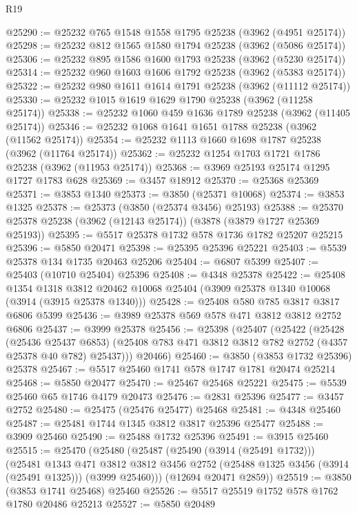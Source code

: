 \begin{lexlean}{R19}
\begin{coremodule}
@25290 := @25232 @765 @1548 @1558 @1795 @25238 (@3962 (@4951 @25174))
@25298 := @25232 @812 @1565 @1580 @1794 @25238 (@3962 (@5086 @25174))
@25306 := @25232 @895 @1586 @1600 @1793 @25238 (@3962 (@5230 @25174))
@25314 := @25232 @960 @1603 @1606 @1792 @25238 (@3962 (@5383 @25174))
@25322 := @25232 @980 @1611 @1614 @1791 @25238 (@3962 (@11112 @25174))
@25330 := @25232 @1015 @1619 @1629 @1790 @25238 (@3962 (@11258 @25174))
@25338 := @25232 @1060 @459 @1636 @1789 @25238 (@3962 (@11405 @25174))
@25346 := @25232 @1068 @1641 @1651 @1788 @25238 (@3962 (@11562 @25174))
@25354 := @25232 @1113 @1660 @1698 @1787 @25238 (@3962 (@11764 @25174))
@25362 := @25232 @1254 @1703 @1721 @1786 @25238 (@3962 (@11953 @25174))
@25368 := @3969 @25193 @25174 @1295 @1727 @1783 @628
@25369 := @3457 @18912
@25370 := @25368 @25369
@25371 := @3853 @1340
@25373 := @3850 (@25371 @10068)
@25374 := @3853 @1325
@25378 := @25373 (@3850 (@25374 @3456) @25193)
@25388 := @25370 @25378 @25238 (@3962 (@12143 @25174)) (@3878 (@3879 @1727 @25369 @25193))
@25395 := @5517 @25378 @1732 @578 @1736 @1782 @25207 @25215
@25396 := @5850 @20471
@25398 := @25395 @25396 @25221
@25403 := @5539 @25378 @134 @1735 @20463 @25206
@25404 := @6807 @5399
@25407 := @25403 (@10710 @25404) @25396
@25408 := @4348 @25378
@25422 := @25408
    @1354
    @1318
    @3812
    @20462
    @10068
    @25404
    (@3909 @25378 @1340 @10068 (@3914 (@3915 @25378 @1340)))
@25428 := @25408 @580 @785 @3817 @3817 @6806 @5399
@25436 := @3989 @25378 @569 @578 @471 @3812 @3812 @2752 @6806
@25437 := @3999 @25378
@25456 := @25398
    (@25407
      (@25422
        (@25428
          (@25436 @25437 @6853)
          (@25408 @783 @471 @3812 @3812 @782 @2752 (@4357 @25378 @40 @782) @25437)))
      @20466)
@25460 := @3850 (@3853 @1732 @25396) @25378
@25467 := @5517 @25460 @1741 @578 @1747 @1781 @20474 @25214
@25468 := @5850 @20477
@25470 := @25467 @25468 @25221
@25475 := @5539 @25460 @65 @1746 @4179 @20473
@25476 := @2831 @25396
@25477 := @3457 @2752
@25480 := @25475 (@25476 @25477) @25468
@25481 := @4348 @25460
@25487 := @25481 @1744 @1345 @3812 @3817 @25396 @25477
@25488 := @3909 @25460
@25490 := @25488 @1732 @25396
@25491 := @3915 @25460
@25515 := @25470
    (@25480
      (@25487
        (@25490 (@3914 (@25491 @1732)))
        (@25481
          @1343
          @471
          @3812
          @3812
          @3456
          @2752
          (@25488 @1325 @3456 (@3914 (@25491 @1325)))
          (@3999 @25460)))
      (@12694 @20471 @2859))
@25519 := @3850 (@3853 @1741 @25468) @25460
@25526 := @5517 @25519 @1752 @578 @1762 @1780 @20486 @25213
@25527 := @5850 @20489

\end{coremodule}
\end{lexlean}
